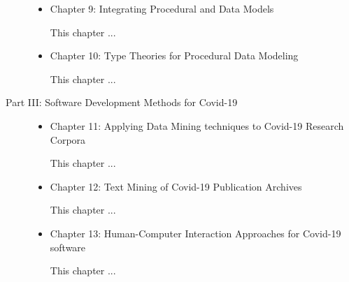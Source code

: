 \documentclass{statsoc}
\newenvironment{summary}[1][0]{\let\BEGIN\begin\let\END\end\grabsummary{#1}}{}%
\begin{document}
\begin{description}
\begin{itemize}
\item Chapter 9: Integrating Procedural and Data Models

\begin{summary}
This chapter ...
\end{summary}

\item Chapter 10: Type Theories for Procedural Data Modeling

\begin{summary}
This chapter ...
\end{summary}

\end{itemize}

\item[Part III: Software Development Methods for Covid-19]

\begin{itemize}

\item Chapter 11: Applying Data Mining techniques to Covid-19 Research Corpora

\begin{summary}
This chapter ...
\end{summary}

\item Chapter 12: Text Mining of Covid-19 Publication Archives

\begin{summary}
This chapter ...
\end{summary}

\item Chapter 13: Human-Computer Interaction Approaches for Covid-19 software 

\begin{summary}
This chapter ...
\end{summary}

\end{itemize}

\end{description}
\end{document}
